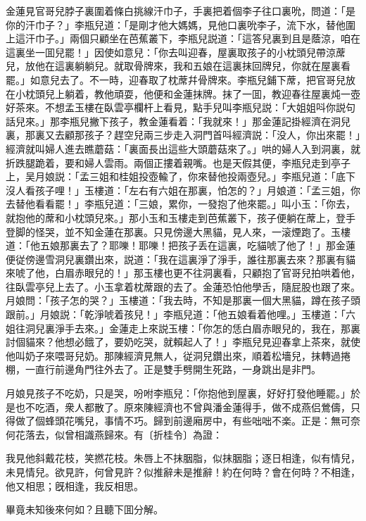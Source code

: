 金蓮見官哥兒脖子裏圍着條白挑線汗巾子，手裏把着個李子往口裏吮，問道：「是你的汗巾子？」李瓶兒道：「是剛才他大媽媽，見他口裏吮李子，流下水，替他圍上這汗巾子。」兩個只顧坐在芭蕉叢下，李瓶兒説道：「這答兒裏到且是蔭涼，咱在這裏坐一囬兒罷！」因使如意兒：「你去叫迎春，屋裏取孩子的小枕頭兒帶涼蓆兒，放他在這裏躺躺兒。就取骨牌來，我和五娘在這裏抹回牌兒，你就在屋裏看罷。」如意兒去了。不一時，迎春取了枕蓆幷骨牌來。李瓶兒鋪下蓆，把官哥兒放在小枕頭兒上躺着，教他頑耍，他便和金蓮抹牌。抹了一囬，教迎春往屋裏炖一壺好茶來。不想孟玉樓在臥雲亭欄杆上看見，點手兒叫李瓶兒説：「大姐姐呌你説句話兒來。」那李瓶兒撇下孩子，教金蓮看着：「我就來！」那金蓮記掛經濟在洞兒裏，那裏又去顧那孩子？趕空兒兩三步走入洞門首呌經濟説：「没人，你出來罷！」經濟就叫婦人進去瞧蘑菇：「裏面長出這些大頭蘑菇來了。」哄的婦人入到洞裏，就折跌腿跪着，要和婦人雲雨。兩個正摟着親嘴。也是天假其便，李瓶兒走到亭子上，吴月娘説：「孟三姐和桂姐投壺輸了，你來替他投兩壺兒。」李瓶兒道：「底下沒人看孩子哩！」玉樓道：「左右有六姐在那裏，怕怎的？」月娘道：「孟三姐，你去替他看看罷！」李瓶兒道：「三娘，累你，一發抱了他來罷。」叫小玉：「你去，就抱他的蓆和小枕頭兒來。」那小玉和玉樓走到芭蕉叢下，孩子便躺在蓆上，登手登脚的怪哭，並不知金蓮在那裏。只見傍邊大黑貓，見人來，一滚煙跑了。玉樓道：「他五娘那裏去了？耶嚛！耶嚛！把孩子丢在這裏，吃貓唬了他了！」那金蓮便従傍邊雪洞兒裏鑽出來，説道：「我在這裏淨了淨手，誰往那裏去來？那裏有貓來唬了他，白眉赤眼兒的！」那玉樓也更不往洞裏看，只顧抱了官哥兒拍哄着他，往臥雲亭兒上去了。小玉拿着枕蓆跟的去了。金蓮恐怕他學舌，隨屁股也跟了來。月娘問：「孩子怎的哭？」玉樓道：「我去時，不知是那裏一個大黑貓，蹲在孩子頭跟前。」月娘説：「乾淨唬着孩兒！」李瓶兒道：「他五娘看着他哩。」玉樓道：「六姐往洞兒裏淨手去來。」金蓮走上來説玉樓：「你怎的恁白眉赤眼兒的，我在，那裏討個貓來？他想必餓了，要奶吃哭，就賴起人了！」李瓶兒見迎春拿上茶來，就使他叫奶子來喂哥兒奶。那陳經濟見無人，従洞兒鑽出來，順着松墻兒，抹轉過捲棚，一直行前邊角門往外去了。正是雙手劈開生死路，一身跳出是非門。

月娘見孩子不吃奶，只是哭，吩咐李瓶兒：「你抱他到屋裏，好好打發他睡罷。」於是也不吃酒，衆人都散了。原來陳經濟也不曾與潘金蓮得手，做不成燕侣鶯儔，只得做了個蜂頭花嘴兒，事情不巧。歸到前邊廂房中，有些咄咄不楽。正是：無可奈何花落去，似曾相識燕歸來。有〔折桂令〕為證：

\begin{myquote}
我見他斜戴花枝，笑撚花枝。朱唇上不抹胭脂，似抹胭脂；逐日相逢，似有情兒，未見情兒。欲見許，何曾見許？似推辭未是推辭！約在何時？會在何時？不相逢，他又相思；旣相逢，我反相思。
\end{myquote}

畢竟未知後來何如？且聽下囬分解。

